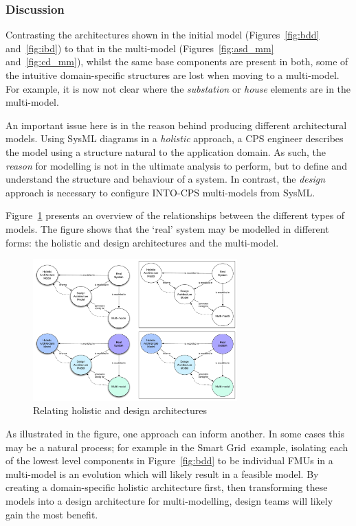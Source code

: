 \subsubsection*{Discussion}

Contrasting the architectures shown in the initial model (Figures~\ref{fig:bdd} and~\ref{fig:ibd}) to that in the multi-model (Figures~\ref{fig:asd_mm} and~\ref{fig:cd_mm}), whilst the same base components are present in both, some of the intuitive domain-specific structures are lost when moving to a multi-model. For example, it is now not clear where the \emph{substation} or \emph{house} elements are in the multi-model.

An important issue here is in the reason behind producing different architectural models. Using SysML diagrams in a \emph{holistic} approach, a CPS engineer describes the model using a structure natural to the application domain. As such, the \emph{reason} for modelling is not in the ultimate analysis to perform, but to define and understand the structure and behaviour of a system. In contrast, the \emph{design} approach is necessary to configure INTO-CPS multi-models from SysML.

Figure~\ref{fig:sysml_mm} presents an overview of the relationships between the different types of models. The figure shows that the `real' system may be modelled in different forms: the holistic and design architectures and the multi-model.

\begin{figure}
\centering
\includegraphics[width=0.7\textwidth]{figures/sysml_for_mm}
\caption{Relating holistic and design architectures}
\label{fig:sysml_mm}
\end{figure}

As illustrated in the figure, one approach can inform another. In some cases this may be a natural process; for example in the Smart Grid\ example, isolating each of the lowest level components in Figure~\ref{fig:bdd} to be individual FMUs in a multi-model is an evolution which will likely result in a feasible model. By creating a domain-specific holistic architecture first, then transforming these models into a design architecture for multi-modelling, design teams will likely gain the most benefit.


